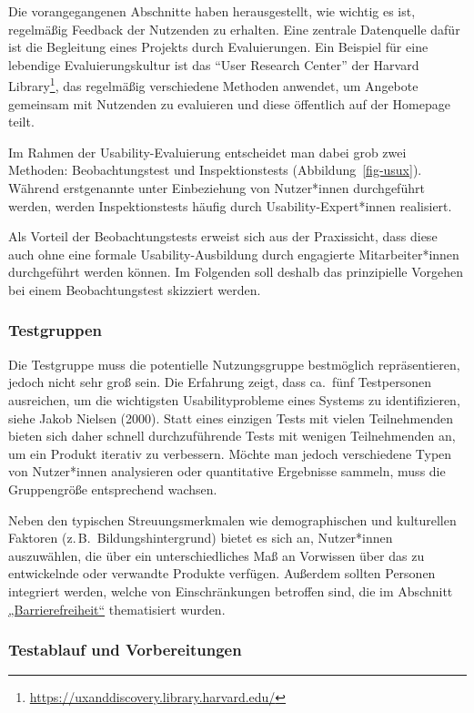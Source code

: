 \documentclass[
  11pt,
  letterpaper,
  DIV=11,
  twoside]{scrreprt}
\DeclareRobustCommand{\href}[2]{#2\footnote{\url{#1}}}
\begin{document}
Die vorangegangenen Abschnitte haben herausgestellt, wie wichtig es ist,
regelmäßig Feedback der Nutzenden zu erhalten. Eine zentrale Datenquelle
dafür ist die Begleitung eines Projekts durch Evaluierungen. Ein
Beispiel für eine lebendige Evaluierungskultur ist das
``\href{https://uxanddiscovery.library.harvard.edu/}{User Research
Center'' der Harvard Library}, das regelmäßig verschiedene Methoden
anwendet, um Angebote gemeinsam mit Nutzenden zu evaluieren und diese
öffentlich auf der Homepage teilt.

Im Rahmen der Usability-Evaluierung entscheidet man dabei grob zwei
Methoden: Beobachtungstest und Inspektionstests
(Abbildung~\ref{fig-usux}). Während erstgenannte unter Einbeziehung von
Nutzer*innen durchgeführt werden, werden Inspektionstests häufig durch
Usability-Expert*innen realisiert.

Als Vorteil der Beobachtungstests erweist sich aus der Praxissicht, dass
diese auch ohne eine formale Usability-Ausbildung durch engagierte
Mitarbeiter*innen durchgeführt werden können. Im Folgenden soll deshalb
das prinzipielle Vorgehen bei einem Beobachtungstest skizziert werden.

\subsubsection{Testgruppen}\label{testgruppen}

Die Testgruppe muss die potentielle Nutzungsgruppe bestmöglich
repräsentieren, jedoch nicht sehr groß sein. Die Erfahrung zeigt, dass
ca.~fünf Testpersonen ausreichen, um die wichtigsten Usabilityprobleme
eines Systems zu identifizieren, siehe Jakob Nielsen (2000). Statt eines
einzigen Tests mit vielen Teilnehmenden bieten sich daher schnell
durchzuführende Tests mit wenigen Teilnehmenden an, um ein Produkt
iterativ zu verbessern. Möchte man jedoch verschiedene Typen von
Nutzer*innen analysieren oder quantitative Ergebnisse sammeln, muss die
Gruppengröße entsprechend wachsen.

Neben den typischen Streuungsmerkmalen wie demographischen und
kulturellen Faktoren (z.\,B.~Bildungshintergrund) bietet es sich an,
Nutzer*innen auszuwählen, die über ein unterschiedliches Maß an
Vorwissen über das zu entwickelnde oder verwandte Produkte verfügen.
Außerdem sollten Personen integriert werden, welche von Einschränkungen
betroffen sind, die im Abschnitt
\hyperref[accessibility]{„Barrierefreiheit``} thematisiert wurden.

\subsubsection{Testablauf und
Vorbereitungen}\label{testablauf-und-vorbereitungen}
\end{document}
